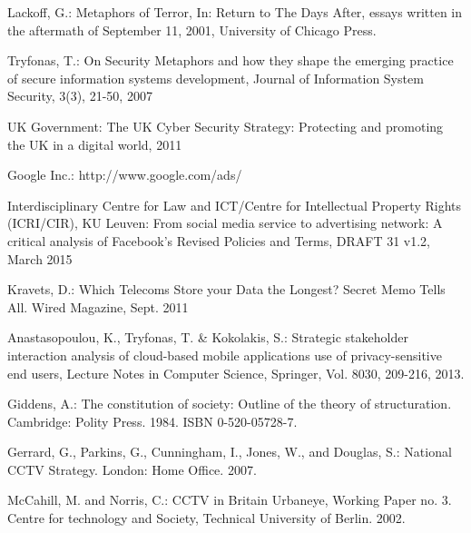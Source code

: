 \documentclass{llncs}
\begin{document}
\begin{thebibliography}{}
Lackoff, G.:
Metaphors of Terror, In: Return to The Days After, essays written in the aftermath of September 11, 2001, University of Chicago Press. 

Tryfonas, T.:
On Security Metaphors and how they shape the emerging practice of secure information systems development, Journal of Information System Security, 3(3), 21-50, 2007

UK Government:
The UK Cyber Security Strategy: Protecting and promoting the UK in a digital world, 2011

Google Inc.:
http://www.google.com/ads/

Interdisciplinary Centre for Law and ICT/Centre for Intellectual Property Rights (ICRI/CIR), KU Leuven:
From social media service to advertising network: A critical analysis of Facebook’s Revised Policies and Terms, DRAFT 31 v1.2, March 2015

Kravets, D.:
Which Telecoms Store your Data the Longest? Secret Memo Tells All. Wired Magazine, Sept. 2011

Anastasopoulou, K., Tryfonas, T. \& Kokolakis, S.:
Strategic stakeholder interaction analysis of cloud-based mobile applications use of privacy-sensitive end users, Lecture Notes in Computer Science, Springer, Vol. 8030, 209-216, 2013.

Giddens, A.:
The constitution of society: Outline of the theory of structuration. Cambridge: Polity Press. 1984. ISBN 0-520-05728-7.

Gerrard, G., Parkins, G., Cunningham, I., Jones, W., and Douglas, S.:
National CCTV Strategy. London: Home Office. 2007.

McCahill, M. and Norris, C.:
CCTV in Britain Urbaneye, Working Paper no. 3. Centre for technology and Society, Technical University of Berlin. 2002.

\end{thebibliography}
\end{document}
